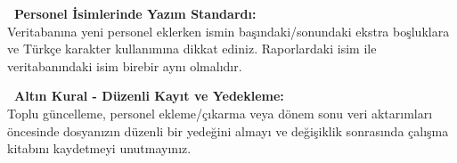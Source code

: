\vspace{0.2cm}

\begin{tcolorbox}[colback=lightgray,colframe=bordergray,leftrule=3.5pt,boxrule=0.4pt,top=6pt,bottom=6pt]
    \textbf{\textcolor{primary}{\faUserCheck\ Personel İsimlerinde Yazım Standardı:}}\\
    \small Veritabanına yeni personel eklerken ismin başındaki/sonundaki ekstra boşluklara ve Türkçe karakter kullanımına dikkat ediniz. Raporlardaki isim ile veritabanındaki isim birebir aynı olmalıdır.
\end{tcolorbox}

\vspace{0.2cm}

\begin{tcolorbox}[colback=yellow!15,colframe=orange!80!black,leftrule=3.5pt,boxrule=0.4pt,top=6pt,bottom=6pt]
    \textbf{\textcolor{orange!80!black}{\faHistory\ Altın Kural - Düzenli Kayıt ve Yedekleme:}}\\
    \small Toplu güncelleme, personel ekleme/çıkarma veya dönem sonu veri aktarımları öncesinde dosyanızın düzenli bir yedeğini almayı ve değişiklik sonrasında çalışma kitabını kaydetmeyi unutmayınız.
\end{tcolorbox}